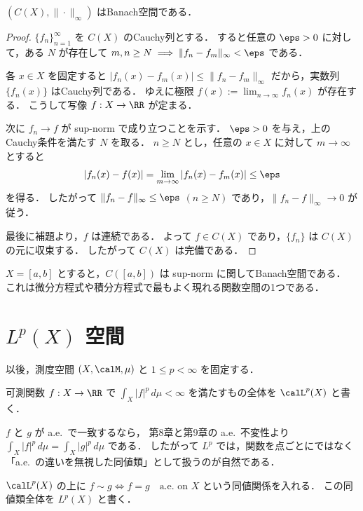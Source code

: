 \begin{theorem}
$(C(X),\|\cdot\|_\infty)$ はBanach空間である．
\end{theorem}
\begin{proof}
$\{f_n\}_{n=1}^{\infty}$ を $C(X)$ のCauchy列とする．
すると任意の $\eps>0$ に対して，ある $N$ が存在して
$m,n\ge N \implies \|f_n-f_m\|_\infty<\eps$ である．

各 $x\in X$ を固定すると
$|f_n(x)-f_m(x)|\le \|f_n-f_m\|_\infty$ だから，実数列 $\{f_n(x)\}$ はCauchy列である．
ゆえに極限 $f(x):=\lim_{n\to\infty}f_n(x)$ が存在する．
こうして写像 $f:X\to\RR$ が定まる．

次に $f_n\to f$ が sup-norm で成り立つことを示す．
$\eps>0$ を与え，上のCauchy条件を満たす $N$ を取る．
$n\ge N$ とし，任意の $x\in X$ に対して $m\to\infty$ とすると
\[
|f_n(x)-f(x)|
=
\lim_{m\to\infty}|f_n(x)-f_m(x)|
\le \eps
\]
を得る．
したがって
$\|f_n-f\|_\infty\le \eps$ $(n\ge N)$ であり，$\|f_n-f\|_\infty\to 0$ が従う．

最後に補題より，$f$ は連続である．
よって $f\in C(X)$ であり，$\{f_n\}$ は $C(X)$ の元に収束する．
したがって $C(X)$ は完備である．
\end{proof}

\begin{example}
$X=[a,b]$ とすると，$C([a,b])$ は sup-norm に関してBanach空間である．
これは微分方程式や積分方程式で最もよく現れる関数空間の1つである．
\end{example}

\section{\texorpdfstring{$L^p(X)$}{Lp(X)} 空間}

以後，測度空間 $(X,\calM,\mu)$ と $1\le p<\infty$ を固定する．

\begin{definition}
可測関数 $f:X\to\RR$ で
$\int_X |f|^p\,d\mu<\infty$ を満たすもの全体を $\calL^p(X)$ と書く．
\end{definition}

\begin{remark}
$f$ と $g$ が a.e.\ で一致するなら，
第8章と第9章の a.e.\ 不変性より
$\int_X |f|^p\,d\mu=\int_X |g|^p\,d\mu$ である．
したがって $L^p$ では，関数を点ごとにではなく
「a.e.\ の違いを無視した同値類」として扱うのが自然である．
\end{remark}

\begin{definition}[\texorpdfstring{$L^p(X)$}{Lp(X)}]
$\calL^p(X)$ の上に $f\sim g \iff f=g \quad \text{a.e.\ on } X$ という同値関係を入れる．
この同値類全体を $L^p(X)$ と書く．
\end{definition}

